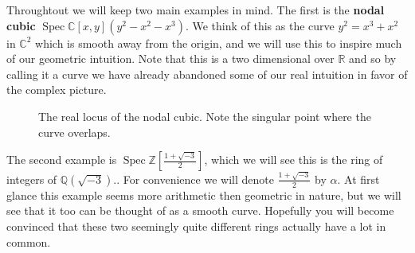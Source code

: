\documentclass{article}
\DeclareMathOperator{\Spec}{Spec}
\newcommand{\Z}{\ensuremath{\mathbb{Z}}}
\newcommand{\C}{\ensuremath{\mathbb{C}}}
\newcommand{\R}{\ensuremath{\mathbb{R}}}
\newcommand{\Q}{\ensuremath{\mathbb{Q}}}
\theoremstyle{definition}
\begin{document}
Throughtout we will keep two main examples in mind.
The first is the \textbf{nodal cubic} $\Spec \C[x,y](y^2-x^2-x^3)$.
We think of this as the curve $y^2 = x^3 + x^2$ in $\C^2$ which is smooth away from the origin, and we will use this to inspire much of our geometric intuition.
Note that this is a two dimensional over $\R$ and so by calling it a curve we have already abandoned some of our real intuition in favor of the complex picture.

\begin{figure}
  \centering
  
  
  \caption{The real locus of the nodal cubic. Note the singular point where the curve overlaps.}
  \end{figure}

The second example is $\Spec \Z\left[\frac{1+\sqrt{-3}}{2}\right]$, which we will see this is the ring of integers of $\Q(\sqrt{-3})$..
For convenience we will denote $\frac{1+\sqrt{-3}}{2}$ by $\alpha$.
At first glance this example seems more arithmetic then geometric in nature, but we will see that it too can be thought of as a smooth curve.
Hopefully you will become convinced that these two seemingly quite different rings actually have a lot in common.

\end{document}
